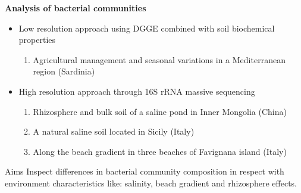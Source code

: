 \documentclass[10pt]{beamer}
\begin{document}
\begin{frame}
	\textbf{\Large{Analysis of bacterial communities}}
	\vspace{5mm}
	
	\begin{itemize}
		\item Low resolution approach using DGGE combined with soil biochemical properties
		\begin{enumerate}
			\item Agricultural management and seasonal variations in a Mediterranean region (Sardinia)
		\end{enumerate}
		\item High resolution approach through 16S rRNA massive sequencing
		\begin{enumerate}
			\item Rhizosphere and bulk soil of a saline pond in Inner Mongolia (China)
			\item A natural saline soil located in Sicily (Italy)
			\item Along the beach gradient in three beaches of Favignana island (Italy)		
		\end{enumerate}		
	\end{itemize}
	\vspace{3mm}
	\begin{block}{Aims}
		Inspect differences in bacterial community composition in respect with environment characteristics like: salinity, beach gradient and rhizosphere effects.
	\end{block}
\end{frame}

\end{document}
